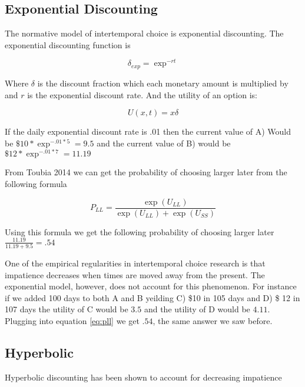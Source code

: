 \documentclass[]{article}
\begin{document}
\subsection{Exponential Discounting}

The normative model of intertemporal choice is exponential discounting.
The exponential discounting function is  

\begin{equation}\label{eq:exp}
	\delta_{exp} = \exp^{-rt}
\end{equation}


Where $\delta$ is the discount fraction which each monetary amount is multiplied by and $r$ is the exponential discount rate. And the utility of an option is:

\begin{equation}\label{eq:utilalt}
	U(x, t) = x \delta
\end{equation}



 If the daily exponential discount rate is .01 then the current value of A) Would be $\$10 * \exp^{-.01*5} = 9.5$ and the current value of B) would be $\$12 * \exp^{-.01*7} = 11.19$

From \cite{@Toubia2014} Toubia 2014 we can get the probability of choosing larger later from the following formula

\begin{equation}\label{eq:pll}
	P_{LL} = \frac{\exp(U_{LL})}{\exp(U_{LL})+ \exp(U_{SS})}
\end{equation}


Using this formula we get the following probability of choosing larger later $\frac{11.19}{11.19+9.5} = .54$

One of the empirical regularities in intertemporal choice research is that impatience decreases when times are moved away from the present. The exponential model, however, does not account for this phenomenon. For instance if we added 100 days to both A and B yeilding C) \$10 in 105 days and D) \$ 12 in 107 days the utility of C would be $3.5$ and the utility of D would be $4.11$. Plugging into equation \ref{eq:pll} we get $.54$, the same answer we saw before. 

\subsection{Hyperbolic}

Hyperbolic discounting has been shown to account for decreasing impatience
\end{document}
